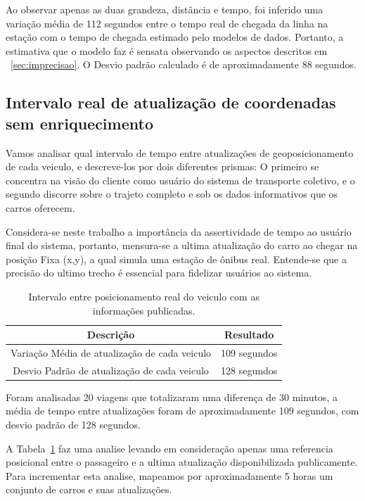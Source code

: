 \documentclass[12pt]{article}
\begin{document}
Ao observar apenas as duas grandeza, distância e tempo, foi inferido uma variação média de 112 segundos entre o tempo real de chegada da linha na estação com o tempo de chegada estimado pelo modelos de dados. Portanto, a estimativa que o modelo faz é sensata observando os aspectos descritos em ~\ref{sec:imprecisao}. O Desvio padrão calculado é de aproximadamente 88 segundos. 

\subsection{Intervalo real de atualização de coordenadas sem enriquecimento} \label{sec:CoorVar}

Vamos analisar qual intervalo de tempo entre atualizações de geoposicionamento de cada veiculo, e descreve-los por dois diferentes prismas: O primeiro se concentra na visão do cliente como usuário do sistema de transporte coletivo, e o segundo discorre sobre o trajeto completo e sob os dados informativos que os carros oferecem.

Considera-se neste trabalho a importância da assertividade de tempo ao usuário final do sistema, portanto, mensura-se a ultima atualização do carro ao chegar na posição Fixa (x,y), a qual simula uma estação de ônibus real. Entende-se que a precisão do ultimo trecho é essencial para fidelizar usuários ao sistema.

\begin{table}[h!]
  \centering
	\begin{tabular}{|c|c|}
      \hline
      Descrição & Resultado \\ \hline
      Variação Média de atualização de cada veiculo & 109 segundos \\ 
      Desvio Padrão de atualização de cada veiculo & 128 segundos \\
      \hline
	\end{tabular}
  \caption{Intervalo entre posicionamento real do veiculo com as informações publicadas.}
  \label{tab:variacoesErroTempo}
\end{table}

Foram analisadas 20 viagens que totalizaram uma diferença de 30 minutos, a média de tempo entre atualizações foram de aproximadamente 109 segundos, com desvio padrão de 128 segundos.

A Tabela~\ref{tab:variacoesErroTempo} faz uma analise levando em consideração apenas uma referencia posicional entre o passageiro e a ultima atualização disponibilizada publicamente. Para incrementar esta analise, mapeamos por aproximadamente 5 horas um conjunto de carros e suas atualizações.
\end{document}
